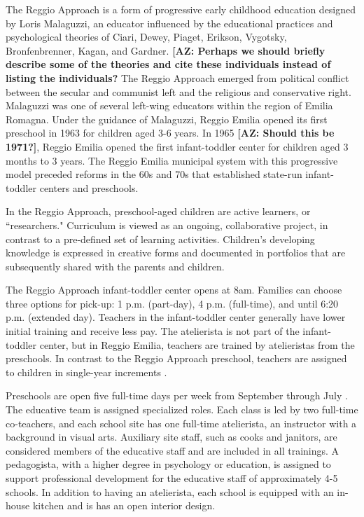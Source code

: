 The Reggio Approach is a form of progressive early childhood education designed by Loris Malaguzzi, an educator influenced by the educational practices and psychological theories of Ciari, Dewey, Piaget, Erikson, Vygotsky, Bronfenbrenner, Kagan, and Gardner. \textbf{[AZ: Perhaps we should briefly describe some of the theories and cite these individuals instead of listing the individuals?} The Reggio Approach emerged from political conflict between the secular and communist left and the religious and conservative right. Malaguzzi was one of several left-wing educators within the region of Emilia Romagna. Under the guidance of Malaguzzi, Reggio Emilia opened its first preschool in 1963 for children aged 3-6 years. In 1965 \textbf{[AZ: Should this be 1971?]}, Reggio Emilia opened the first infant-toddler center for children aged 3 months to 3 years. The Reggio Emilia municipal system with this progressive model preceded reforms in the 60s and 70s that established state-run infant-toddler centers and preschools.

In the Reggio Approach, preschool-aged children are active learners, or ``researchers." Curriculum is viewed as an ongoing, collaborative project, in contrast to a pre-defined set of learning activities. Children's developing knowledge is expressed in creative forms and documented in portfolios that are subsequently shared with the parents and children. 

The Reggio Approach infant-toddler center opens at 8am. Families can choose three options for pick-up: 1 p.m. (part-day), 4 p.m. (full-time), and until 6:20 p.m. (extended day). Teachers in the infant-toddler center generally have lower initial training and receive less pay. The atelierista is not part of the infant-toddler center, but in Reggio Emilia, teachers are trained by atelieristas from the preschools. In contrast to the Reggio Approach preschool, teachers are assigned to children in single-year increments \citep{Cagliari-etal-eds_2016_BOOK_Loris-Malaguzzi,Giudici-Nicolosi_2014_Reggio-Approach}.

Preschools are open five full-time days per week from September through July \citep{Giudici-Nicolosi_2014_Reggio-Approach}. The educative team is assigned specialized roles. Each class is led by two full-time co-teachers, and each school site has one full-time atelierista, an instructor with a background in visual arts. Auxiliary site staff, such as cooks and janitors, are considered members of the educative staff and are included in all trainings. A pedagogista, with a higher degree in psychology or education, is assigned to support professional development for the educative staff of approximately 4-5 schools. In addition to having an atelierista, each school is equipped with an in-house kitchen and is has an open interior design.  

